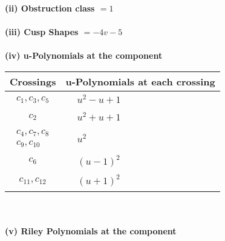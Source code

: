 \documentclass[1p]{elsarticle_modified}
\theoremstyle{definition}
\begin{document}
\flushleft \textbf{(ii) Obstruction class $= 1$}\\~\\
\flushleft \textbf{(iii) Cusp Shapes $= -4 v-5$}\\~\\
\newpage\renewcommand{\arraystretch}{1}
\flushleft \textbf{(iv) u-Polynomials at the component}\newline \\
\begin{tabular}{m{50pt}|m{274pt}}
Crossings & \hspace{64pt}u-Polynomials at each crossing \\
\hline $$\begin{aligned}c_{1},c_{3},c_{5}\end{aligned}$$&$\begin{aligned}
&u^2- u+1
\end{aligned}$\\
\hline $$\begin{aligned}c_{2}\end{aligned}$$&$\begin{aligned}
&u^2+u+1
\end{aligned}$\\
\hline $$\begin{aligned}c_{4},c_{7},c_{8}\\c_{9},c_{10}\end{aligned}$$&$\begin{aligned}
&u^2
\end{aligned}$\\
\hline $$\begin{aligned}c_{6}\end{aligned}$$&$\begin{aligned}
&(u-1)^2
\end{aligned}$\\
\hline $$\begin{aligned}c_{11},c_{12}\end{aligned}$$&$\begin{aligned}
&(u+1)^2
\end{aligned}$\\
\hline
\end{tabular}\\~\\
\newpage\renewcommand{\arraystretch}{1}
\flushleft \textbf{(v) Riley Polynomials at the component}\newline \\
\end{document}
